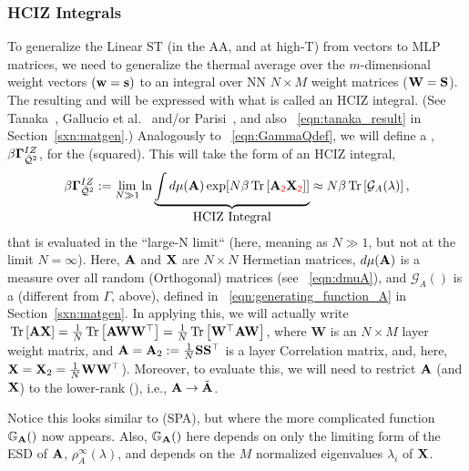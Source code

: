 \subsubsection{HCIZ Integrals}
\label{sxn:mathP_hciz}

To generalize the Linear ST \Perceptron (in the AA, and at high-T) from \Perceptron vectors to MLP matrices,
we need to generalize the thermal average over the $m$-dimensional \Perceptron weight vectors $({\mathbf{w}}={\mathbf{s}})$
to an integral over NN \Student $N \times M$ weight matrices (${\mathbf{W}}=\mathbf{S}$).
The resulting \PartitionFunction and \FreeEnergy will be expressed with what is called an HCIZ integral.
(See Tanaka~\cite{Tanaka2007, Tanaka2008}, Gallucio et al.~\cite{Bouchaud1998} and/or Parisi~\cite{PP95}, and also \EQN~\ref{eqn:tanaka_result} in Section~\ref{sxn:matgen}.)
Analogously to \EQN~\ref{eqn:GammaQdef}, we will define a \emph{\LayerQuality \GeneratingFunction}, $\beta\mathbf{\Gamma}^{IZ}_{\bar{\mathcal{Q}}^{2}}$, for the \LayerQuality (squared).
This will take the form of an HCIZ integral,
\begin{align}
\label{eqn:hciz_prelim}
\beta\mathbf{\Gamma}^{IZ}_{\bar{\mathcal{Q}}^{2}} := \lim_{N\gg 1}\ln \underbrace{\int d\mu(\mathbf{A}) \exp[N\beta\mbox{}\operatorname{Tr}\left[\mathbf{A}_{{\color{red}\sf{2}}}\mathbf{X}_{{\color{red}\sf{2}}}\right]] }_{\mbox{HCIZ Integral}} 
  \approx N\beta\mbox{}\operatorname{Tr}\left[\mathcal{G}_{A}(\lambda)\right]  ,
\end{align}
that is evaluated in the ``large-N limit`` (here, meaning as $N \gg 1$, but not at the limit $N=\infty$).
Here,  $\mathbf{A}$ and $\mathbf{X}$ are  $N \times N$ Hermetian matrices, $d\mu(\mathbf{A})$ is a measure
over all random (Orthogonal) matrices (see \EQN~\ref{eqn:dmuA}),
and $\mathcal{G}_{A}()$ is a  \GeneratingFunction
(different from $\Gamma$, above), defined in \EQN~\ref{eqn:generating_function_A} in Section~\ref{sxn:matgen}. 
In applying this, we will actually write $\mbox{}\operatorname{Tr}\left[\mathbf{A}\mathbf{X}\right]=\tfrac{1}{N}\mbox{}\operatorname{Tr}\left[\mathbf{A}{\mathbf{W}}{\mathbf{W}}^{\top}\right]=\tfrac{1}{N}\mbox{}\operatorname{Tr}\left[{\mathbf{W}}^{\top}\mathbf{A}{\mathbf{W}}\right]$,
where $\mathbf{W}$ is an $N \times M$ layer weight matrix, and $\mathbf{A}=\mathbf{A}_{2}:=\tfrac{1}{N}{\mathbf{S}}{\mathbf{S}}^{\top}$ is a layer
Correlation matrix, and, here,  $\mathbf{X}=\mathbf{X}_2=\tfrac{1}{N}{\mathbf{W}}{\mathbf{W}}^{\top}$).
Moreover, to evaluate this, we will need to restrict $\mathbf{A}$ (and $\mathbf{X}$)
to the lower-rank \EffectiveCorrelationSpace (\ECS),  i.e., $\mathbf{A}\rightarrow\tilde{\mathbf{A}}$.

Notice this looks similar to \SaddlePointApproximation (SPA), but where the more complicated function
$\mathbb{G}_{\mathbf{A}}()$ now appears.
Also, $\mathbb{G}_{\mathbf{A}}()$ here depends on only the limiting form of the ESD of $\mathbf{A}$, $\rho^{\infty}_{A}(\lambda)$,
and depends on the $M$ normalized eigenvalues $\lambda_{i}$ of $\mathbf{X}$.

